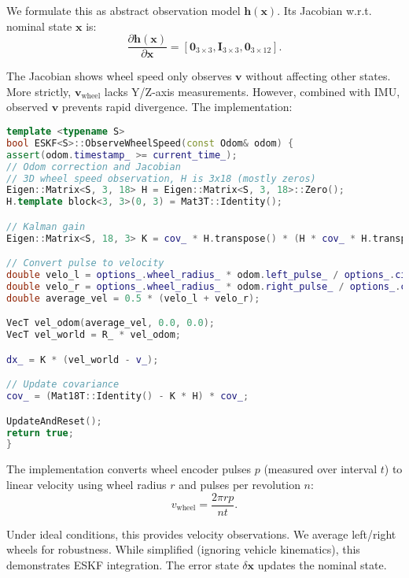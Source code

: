 We formulate this as abstract observation model $\mathbf{h}(\mathbf{x})$. Its Jacobian w.r.t. nominal state $\mathbf{x}$ is:
\begin{equation}\label{eq:wheel-jacobian}
\frac{\partial \mathbf{h} (\mathbf{x})}{\partial \mathbf{x}} = \left[\mathbf{0}_{3\times 3}, \mathbf{I}_{3 \times 3}, \mathbf{0}_{3\times 12} \right].
\end{equation}

The Jacobian shows wheel speed only observes $\mathbf{v}$ without affecting other states. More strictly, $\mathbf{v}_{\mathrm{wheel}}$ lacks Y/Z-axis measurements. However, combined with IMU, observed $\mathbf{v}$ prevents rapid divergence. The implementation:

\begin{lstlisting}[language=c++, caption=src/ch3/eskf.hpp]
template <typename S>
bool ESKF<S>::ObserveWheelSpeed(const Odom& odom) {
assert(odom.timestamp_ >= current_time_);
// Odom correction and Jacobian
// 3D wheel speed observation, H is 3x18 (mostly zeros)
Eigen::Matrix<S, 3, 18> H = Eigen::Matrix<S, 3, 18>::Zero();
H.template block<3, 3>(0, 3) = Mat3T::Identity();

// Kalman gain
Eigen::Matrix<S, 18, 3> K = cov_ * H.transpose() * (H * cov_ * H.transpose() + odom_noise_).inverse();

// Convert pulse to velocity
double velo_l = options_.wheel_radius_ * odom.left_pulse_ / options_.circle_pulse_ * 2 * M_PI / options_.odom_span_;
double velo_r = options_.wheel_radius_ * odom.right_pulse_ / options_.circle_pulse_ * 2 * M_PI / options_.odom_span_;
double average_vel = 0.5 * (velo_l + velo_r);

VecT vel_odom(average_vel, 0.0, 0.0);
VecT vel_world = R_ * vel_odom;

dx_ = K * (vel_world - v_);

// Update covariance
cov_ = (Mat18T::Identity() - K * H) * cov_;

UpdateAndReset();
return true;
}
\end{lstlisting}

The implementation converts wheel encoder pulses $p$ (measured over interval $t$) to linear velocity using wheel radius $r$ and pulses per revolution $n$:
\begin{equation}\label{eq:pulse-to-vel}
v_{\mathrm{wheel}} = \frac{2 \pi r p}{n t} .
\end{equation}

Under ideal conditions, this provides velocity observations. We average left/right wheels for robustness. While simplified (ignoring vehicle kinematics), this demonstrates ESKF integration. The error state $\delta \mathbf{x}$ updates the nominal state.

